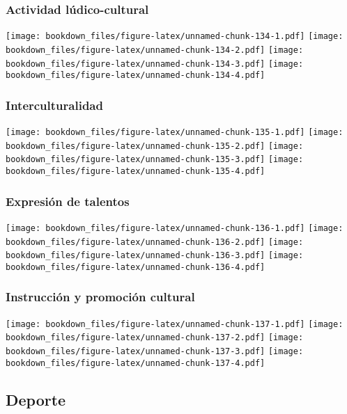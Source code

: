\documentclass[]{article}
\theoremstyle{definition}
\theoremstyle{definition}
\theoremstyle{definition}
\theoremstyle{remark}
\begin{document}
\subsubsection{Actividad
lúdico-cultural}\label{actividad-ludico-cultural}

\texttt{[image: bookdown\_files/figure-latex/unnamed-chunk-134-1.pdf]}
\texttt{[image: bookdown\_files/figure-latex/unnamed-chunk-134-2.pdf]}
\texttt{[image: bookdown\_files/figure-latex/unnamed-chunk-134-3.pdf]}
\texttt{[image: bookdown\_files/figure-latex/unnamed-chunk-134-4.pdf]}

\subsubsection{Interculturalidad}\label{interculturalidad}

\texttt{[image: bookdown\_files/figure-latex/unnamed-chunk-135-1.pdf]}
\texttt{[image: bookdown\_files/figure-latex/unnamed-chunk-135-2.pdf]}
\texttt{[image: bookdown\_files/figure-latex/unnamed-chunk-135-3.pdf]}
\texttt{[image: bookdown\_files/figure-latex/unnamed-chunk-135-4.pdf]}

\subsubsection{Expresión de talentos}\label{expresion-de-talentos}

\texttt{[image: bookdown\_files/figure-latex/unnamed-chunk-136-1.pdf]}
\texttt{[image: bookdown\_files/figure-latex/unnamed-chunk-136-2.pdf]}
\texttt{[image: bookdown\_files/figure-latex/unnamed-chunk-136-3.pdf]}
\texttt{[image: bookdown\_files/figure-latex/unnamed-chunk-136-4.pdf]}

\subsubsection{Instrucción y promoción
cultural}\label{instruccion-y-promocion-cultural}

\texttt{[image: bookdown\_files/figure-latex/unnamed-chunk-137-1.pdf]}
\texttt{[image: bookdown\_files/figure-latex/unnamed-chunk-137-2.pdf]}
\texttt{[image: bookdown\_files/figure-latex/unnamed-chunk-137-3.pdf]}
\texttt{[image: bookdown\_files/figure-latex/unnamed-chunk-137-4.pdf]}

\subsection{Deporte}\label{deporte}
\end{document}
